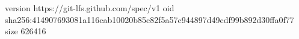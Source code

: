 version https://git-lfs.github.com/spec/v1
oid sha256:414907693081a116cab10020b85c82f5a57c944897d49cdf99b892d30ffa0f77
size 626416
